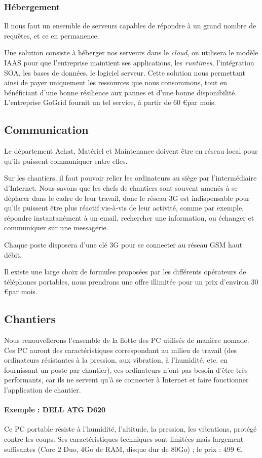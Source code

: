 	\subsubsection{Hébergement}
    Il nous faut un ensemble de serveurs capables de répondre à un grand
    nombre de requêtes, et ce en permanence.

Une solution consiste à héberger nos serveurs dans le \textsl{cloud}, on
utilisera le modèle IAAS pour  que l'entreprise maintient ses applications,
les {\sl runtimes}, l'intégration SOA, les bases de données, le logiciel
serveur.  Cette solution nous permettant ainsi de payer uniquement les
ressources que nous consommons, tout en bénéficiant d'une bonne résilience
aux pannes et d'une bonne disponibilité.  L'entreprise GoGrid fournit un
tel service, à partir de 60 \euro par mois.


\subsection{Communication}
Le département Achat, Matériel et Maintenance doivent être en réseau local
pour qu'ils puissent  communiquer entre elles.

Sur les chantiers, il faut pouvoir relier les ordinateurs au siège par
l'intermédiaire d'Internet.  Nous savons que les chefs de chantiers sont
souvent amenés à se déplacer dans le cadre de leur travail, donc le réseau
3G est indispensable pour qu'ils puissent être plus réactif vis-à-vis de
leur activité, comme par exemple, répondre instantanément à un email,
rechercher une information, ou échanger et communiquer sur une messagerie. 

Chaque poste disposera d’une clé 3G pour se connecter au réseau GSM haut
débit.

Il existe une large choix de formules proposées par les différents
opérateurs de téléphones portables, nous prendrons une offre illimitée pour un prix 
d'environ 30 \euro par mois.

\subsection{Chantiers}

Nous renouvellerons l'ensemble de la flotte des PC utilisés de manière nomade.
Ces PC auront des caractéristiques correspondant au milieu de
travail (des ordinateurs résistantes à la pression, aux vibration, à
l'humidité, etc.  en fournissant un poste par chantier), ces ordinateurs
n'ont pas besoin d’être très performants, car ils ne servent qu'à se
connecter à Internet et faire fonctionner l'application de chantier.

\paragraph{Exemple : DELL ATG D620}
Ce PC portable résiste à l'humidité, l'altitude,
la pression, les vibrations, protégé contre les coups.
Ses caractéristiques techniques sont limitées mais largement suffisantes
(Core 2 Duo, 4Go de RAM, disque dur de 80Go) ; le prix : 499 \euro.
